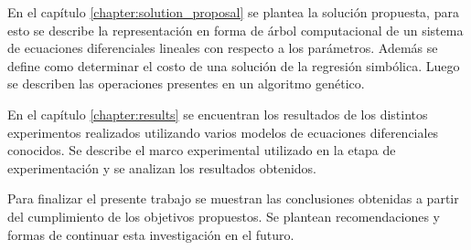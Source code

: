 En el capítulo \ref{chapter:solution_proposal} se plantea la solución propuesta, para esto se describe la representación en forma de árbol computacional de un sistema de ecuaciones diferenciales lineales con respecto a los parámetros. Además se define como determinar el costo de una solución de la regresión simbólica. Luego se describen las operaciones presentes en un algoritmo genético.

En el capítulo \ref{chapter:results} se encuentran los resultados de los distintos experimentos realizados utilizando varios modelos de ecuaciones diferenciales conocidos. Se describe el marco experimental utilizado en la etapa de experimentación y se analizan los resultados obtenidos.

Para finalizar el presente trabajo se muestran las conclusiones obtenidas a partir del cumplimiento de los objetivos propuestos. Se plantean recomendaciones y formas de continuar esta investigación en el futuro.